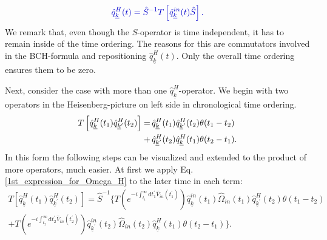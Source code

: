 \documentclass[
11pt, %
english, %
singlespacing, %
headsepline, %
]{MastersDoctoralThesis} %
\begin{document}
 \begin{equation}\label{Gell_Mann-Low_for_one_Q}
\begin{split}
 \textcolor[RGB]{0,0,204}{
\hat{q}^{H}_{\underline{k}}(t)
=
\hat{S}^{-1} 
T
\left[ 
\hat{q}^{in}_{\underline{k}}(t)
\hat{S}
\right]
.
}
\end{split}
\end{equation}
We remark that, even though the $ \hat{S} $-operator is time independent, it has to remain inside of the time ordering. The reasons for this are commutators involved in the BCH-formula and repositioning $ \hat{q}^{H}_{\underline{k}}(t) $. Only the overall time ordering ensures them to be zero.

Next, consider the case with more than one $ \hat{q}^{H}_{\underline{k}} $-operator. We begin with two operators in the Heisenberg-picture on left side in chronological time ordering.
\begin{equation}
\begin{split}
T\left[
\hat{q}^{H}_{\underline{k}}(t_1)
\hat{q}^{H}_{\underline{k}^{\prime}}(t_2)
\right]
=&
\thinspace
\hat{q}^{H}_{\underline{k}}(t_1)
\hat{q}^{H}_{\underline{k}^{\prime}}(t_2)
\theta(t_{1}-t_{2})
\\
\thinspace\thinspace
+&
\thinspace
\hat{q}^{H}_{\underline{k}^{\prime}}(t_2)
\hat{q}^{H}_{\underline{k}}(t_1)
\theta(t_{2}-t_{1})
.
\end{split}
\end{equation}
In this form the following steps can be visualized and extended to the product of more operators, much easier. At first we apply Eq.\enskip\eqref{1st_expression_for_Omega_H} to the later time in each term:
\begin{equation}
\begin{split}
T\left[
\hat{q}^{H}_{\underline{k}}(t_1)
\hat{q}^{H}_{\underline{k}^{\prime}}(t_2)
\right]
=
\hat{S}^{-1}
\Big\{
T\left(  e^{-i\int_{t_{1}}^{\infty}\mathrm{d}t^{\prime}_{1} \hat{V}_{in}(t_{1}^{\prime})}\right)\hat{q}^{in}_{\underline{k}}(t_1)\hat{\Omega}_{in}(t_1) \hat{q}^{H}_{\underline{k}^{\prime}}(t_2)   \theta(t_1 - t_2)
		\\
    + T\left(  e^{-i\int_{t_{2}}^{\infty}\mathrm{d}t^{\prime}_{2} \hat{V}_{in}(t_{2}^{\prime})}\right)\hat{q}^{in}_{\underline{k}^{\prime}}(t_2)\hat{\Omega}_{in}(t_2) 
      \hat{q}^{H}_{\underline{k}}(t_1)   \theta(t_2 - t_1)
    \Big\}
    .  
    \end{split} 
\end{equation}
\end{document}
